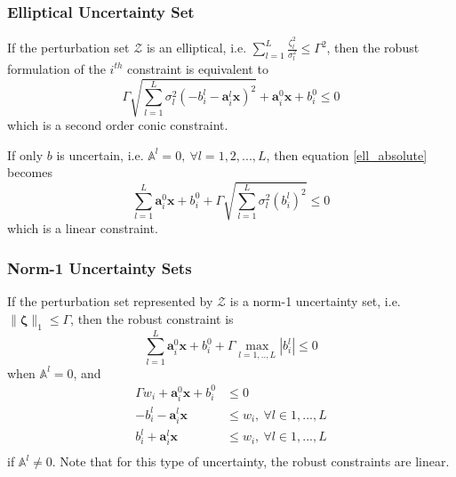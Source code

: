 \subsubsection{Elliptical Uncertainty Set}
If the perturbation set $\mathcal{Z}$ is an elliptical, i.e. $\textstyle{\sum}_{l=1}^L\frac{\zeta_l^2}{\sigma_l^2} \leq \Gamma^2$,
then the robust formulation of the $i^{th}$ constraint is equivalent to
\begin{equation}
    \Gamma \sqrt{\textstyle{\sum}_{l=1}^L \sigma_l^2(- b^l_{i} - \mathbf{a}^l_{i}\mathbf{x})^2} + \mathbf{a}^0_{i}\mathbf{x} + b^0_{i} \leq 0
    \label{ell_absolute}
\end{equation}
which is a second order conic constraint.

If only $b$ is uncertain, i.e. $\mathbb{A}^l = 0,~\forall l = 1,2,...,L$, then equation \eqref{ell_absolute} becomes
\begin{equation}
    \textstyle{\sum}_{l=1}^L \mathbf{a}^0_{i}\mathbf{x} + b^0_{i} + \Gamma \sqrt{\textstyle{\sum}_{l=1}^L \sigma_l^2(b^l_{i})^2} \leq 0
    \label{ell_coeff}
\end{equation}
which is a linear constraint.

\subsubsection{Norm-1 Uncertainty Sets}

If the perturbation set represented by $\mathcal{Z}$ is a norm-1 uncertainty set, i.e. $\|\mathbf{\zeta}\|_1 \leq \Gamma$,
then the robust constraint is
\begin{equation}
    \textstyle{\sum}_{l=1}^L \mathbf{a}^0_{i}\mathbf{x} + b^0_{i} + \Gamma \max_{l=1,..,L} |b^l_{i}| \leq 0
    \label{rom_coeff}
\end{equation}
when $\mathbb{A}^l = 0$, and
\begin{equation}
    \begin{split}
        \Gamma w_{i} + \mathbf{a}^0_{i}\mathbf{x} + b^0_{i} &\leq 0 \\
        - b^l_{i} - \mathbf{a}^l_{i}\mathbf{x} &\leq w_{i},~\forall l \in 1,...,L\\
        b^l_{i} + \mathbf{a}^l_{i}\mathbf{x} &\leq w_{i},~\forall l \in 1,...,L\\
    \end{split}
    \label{rom_linear}
\end{equation}
if $\mathbb{A}^l \neq 0$. Note that for this type of uncertainty, the robust constraints are linear.
